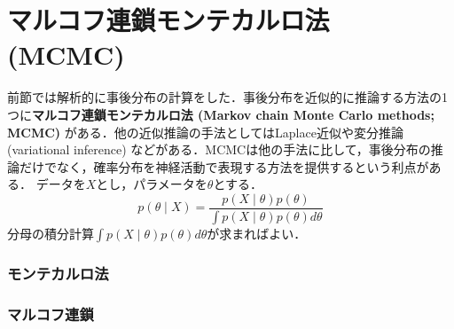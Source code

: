 \section{マルコフ連鎖モンテカルロ法 (MCMC)}
前節では解析的に事後分布の計算をした．事後分布を近似的に推論する方法の1つに\textbf{マルコフ連鎖モンテカルロ法 (Markov chain Monte Carlo methods; MCMC)} がある．他の近似推論の手法としてはLaplace近似や変分推論 (variational inference) などがある．MCMCは他の手法に比して，事後分布の推論だけでなく，確率分布を神経活動で表現する方法を提供するという利点がある．
データを$X$とし，パラメータを$\theta$とする．
\begin{equation}
p(\theta\mid X)=\frac{p(X\mid \theta)p(\theta)}{\int p(X\mid \theta)p(\theta)d\theta}
\end{equation}
分母の積分計算$\int p(X\mid \theta)p(\theta)d\theta$が求まればよい．
\subsubsection{モンテカルロ法}
\subsubsection{マルコフ連鎖}

